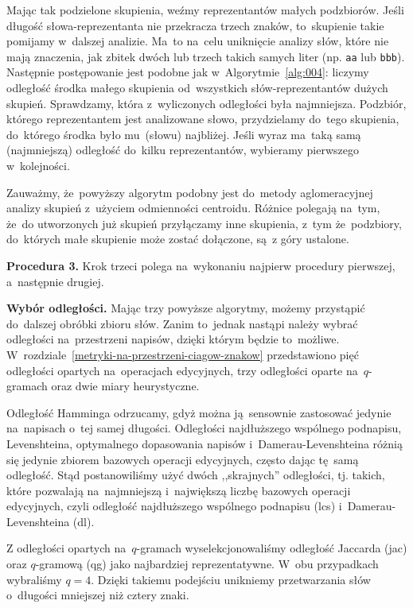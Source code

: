 \documentclass{praca1}
\begin{document}
Mając tak podzielone skupienia, weźmy reprezentantów małych podzbiorów. Jeśli długość słowa-reprezentanta nie przekracza trzech znaków, to~skupienie takie pomijamy w~dalszej analizie. Ma~to na~celu uniknięcie analizy słów, które nie mają znaczenia, jak zbitek dwóch lub trzech takich samych liter (np. \verb|aa| lub \verb|bbb|). Następnie postępowanie jest podobne jak w~Algorytmie~\ref{alg:004}: liczymy odległość środka małego skupienia od~wszystkich słów-reprezentantów dużych skupień. Sprawdzamy, która z~wyliczonych odległości była najmniejsza. Podzbiór, którego reprezentantem jest analizowane słowo, przydzielamy do~tego skupienia, do~którego środka było mu~(słowu) najbliżej. Jeśli wyraz ma~taką samą (najmniejszą) odległość do~kilku reprezentantów, wybieramy pierwszego w~kolejności.

Zauważmy, że~powyższy algorytm podobny jest do~metody aglomeracyjnej analizy skupień z~użyciem odmienności centroidu. Różnice polegają na~tym, że~do utworzonych już skupień przyłączamy inne skupienia, z~tym że~podzbiory, do~których małe skupienie może zostać dołączone, są~z góry ustalone.



\textbf{Procedura 3.} Krok trzeci polega na~wykonaniu najpierw procedury pierwszej, a~następnie drugiej.

\textbf{Wybór odległości.} Mając trzy powyższe algorytmy, możemy przystąpić do~dalszej obróbki zbioru słów. Zanim to~jednak nastąpi należy wybrać odległości na~przestrzeni napisów, dzięki którym będzie to~możliwe. W~rozdziale~\ref{metryki-na-przestrzeni-ciagow-znakow} przedstawiono pięć odległości opartych na~operacjach edycyjnych, trzy odległości oparte na~$q$-gramach oraz dwie miary heurystyczne. 

Odległość Hamminga odrzucamy, gdyż można ją~sensownie zastosować jedynie na~napisach o~tej samej długości. Odległości najdłuższego wspólnego podnapisu, Levenshteina, optymalnego dopasowania napisów i~Damerau-Levenshteina różnią się jedynie zbiorem bazowych operacji edycyjnych, często dając tę~samą odległość. Stąd postanowiliśmy użyć dwóch ,,skrajnych'' odległości, tj. takich, które pozwalają na~najmniejszą i~największą liczbę bazowych operacji edycyjnych, czyli odległość najdłuższego wspólnego podnapisu (lcs) i~Damerau-Levenshteina (dl). 

Z odległości opartych na~$q$-gramach wyselekcjonowaliśmy odległość Jaccarda (jac) oraz $q$-gramową (qg) jako najbardziej reprezentatywne. W~obu przypadkach wybraliśmy $q=4$. Dzięki takiemu podejściu unikniemy przetwarzania słów o~długości mniejszej niż cztery znaki.
\end{document}
